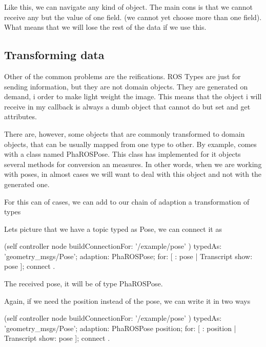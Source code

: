 \documentclass[a4paper,10pt,twoside]{book}
\begin{document}
							
							Like this, we can navigate any kind of object. The main cons is that we cannot receive any but the value of one field. (we cannot yet choose more than one field). What means that we will lose the rest of the data if we use this. 
						
						\subsection{Transforming data}
						
							Other of the common problems are the reifications. ROS Types are just for sending information, but they are not domain objects. They are generated on demand, i order to make light weight the image. This means that the object i will receive in my callback is always a dumb object that cannot do but set and get attributes.
							
							There are, however, some objects that are commonly transformed to domain objects, that can be usually mapped from one type to other. By example, \fwkName{} comes with a class named PhaROSPose. This class has implemented for it objects several methods for conversion an measures. In other words, when we are working with poses, in almost cases we will want to deal with this object and not with the generated one.
							
							For this can of cases, we can add to our chain of adaption a transformation of types
							
							Lets picture that we have a topic typed as Pose, we can connect it as 
							
							
							\begin{code}
				(self controller node buildConnectionFor: '/example/pose' ) 
					typedAs: 'geometry_msgs/Pose'; 
					adaption: PhaROSPose;
					for: [ : pose |  Transcript show: pose ];
					connect .
					
							\end{code}
							
							
							The received pose, it will be of type PhaROSPose. 
							
							Again, if we need the position instead of the pose, we can write it in two ways
							
							\begin{code}
				(self controller node buildConnectionFor: '/example/pose' ) 
					typedAs: 'geometry_msgs/Pose'; 
					adaption: PhaROSPose \> position;
					for: [ : position |  Transcript show: pose ];
					connect .
					
							\end{code}
							
\end{document}
